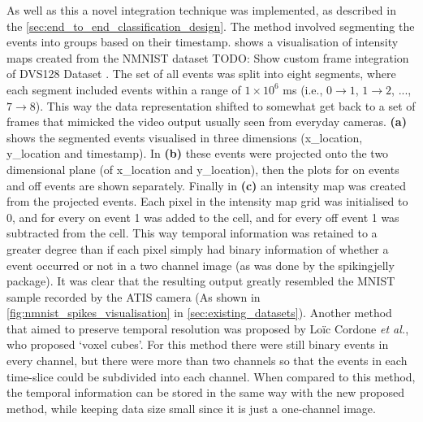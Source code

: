 As well as this a novel integration technique was implemented, as described in the \cref{sec:end_to_end_classification_design}. The method involved segmenting the events into groups based on their timestamp.  shows a visualisation of intensity maps created from the NMNIST\cite{NMNIST} dataset \color{red} TODO: Show custom frame integration of DVS128 Dataset \color{black}. The set of all events was split into eight segments, where each segment included events within a range of $ 1 \times 10^6 $ ms (i.e., $ 0 \rightarrow 1 $, $ 1 \rightarrow 2 $, ..., $ 7 \rightarrow 8 $). This way the data representation shifted to somewhat get back to a set of frames that mimicked the video output usually seen from everyday cameras. \textbf{(a)} shows the segmented events visualised in three dimensions (x\_location, y\_location and timestamp). In \textbf{(b)} these events were projected onto the two dimensional plane (of x\_location and y\_location), then the plots for on events and off events are shown separately. Finally in \textbf{(c)} an intensity map was created from the projected events. Each pixel in the intensity map grid was initialised to 0, and for every on event 1 was added to the cell, and for every off event 1 was subtracted from the cell. This way temporal information was retained to a greater degree than if each pixel simply had binary information of whether a event occurred or not in a two channel image (as was done by the spikingjelly package\cite{SpikingJelly}). It was clear that the resulting output greatly resembled the MNIST\cite{MNIST} sample recorded by the ATIS camera (As shown in \cref{fig:nmnist_spikes_visualisation} in \cref{sec:existing_datasets}). Another method that aimed to preserve temporal resolution was proposed by Lo\"ic Cordone \textit{et al.}, who proposed `voxel cubes'\cite{MiniVovelCubes}. For this method there were still binary events in every channel, but there were more than two channels so that the events in each time-slice could be subdivided into each channel. When compared to this method, the temporal information can be stored in the same way with the new proposed method, while keeping data size small since it is just a one-channel image. 


